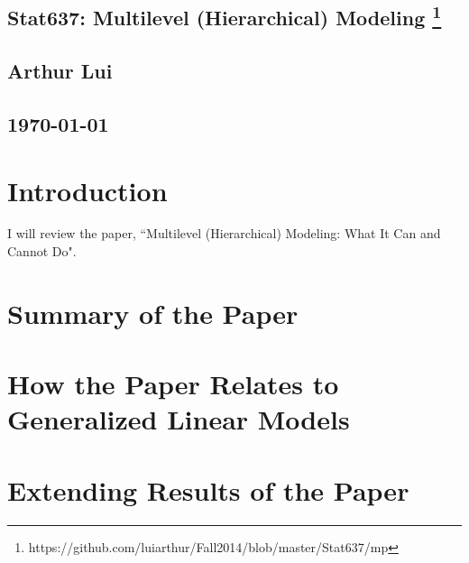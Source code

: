 \documentclass{article}
\begin{document}
\begin{center}
  \section*{\textbf{Stat637: Multilevel (Hierarchical) Modeling}
    \footnote{https://github.com/luiarthur/Fall2014/blob/master/Stat637/mp}
  }  
  \subsection*{\textbf{Arthur Lui}}
  \subsection*{\noindent\today}
\end{center}

\section{Introduction}
I will review the paper, ``Multilevel (Hierarchical) Modeling: What It Can and Cannot Do".

\section{Summary of the Paper}

\section{How the Paper Relates to Generalized Linear Models}

\section{Extending Results of the Paper}
\end{document}
